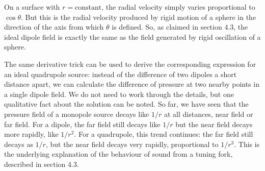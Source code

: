   On a surface with $r=\mathrm{constant}$, the radial velocity simply varies 
  proportional to $\cos \theta$. But this is the radial velocity produced by 
  rigid motion of a sphere in the direction of the axis from which $\theta$ is 
  defined. So, as claimed in section 4.3, the ideal dipole field is exactly the 
  same as the field generated by rigid oscillation of a sphere. 

  The same derivative trick can be used to derive the corresponding expression 
  for an ideal quadrupole source: instead of the difference of two dipoles a 
  short distance apart, we can calculate the difference of pressure at two 
  nearby points in a single dipole field. We do not need to work through the 
  details, but one qualitative fact about the solution can be noted. So far, we 
  have seen that the pressure field of a monopole source decays like $1/r$ at 
  all distances, near field or far field. For a dipole, the far field still 
  decays like $1/r$ but the near field decays more rapidly, like $1/r^2$. For a 
  quadrupole, this trend continues: the far field still decays as $1/r$, but 
  the near field decays very rapidly, proportional to $1/r^3$. This is the 
  underlying explanation of the behaviour of sound from a tuning fork, 
  described in section 4.3. 